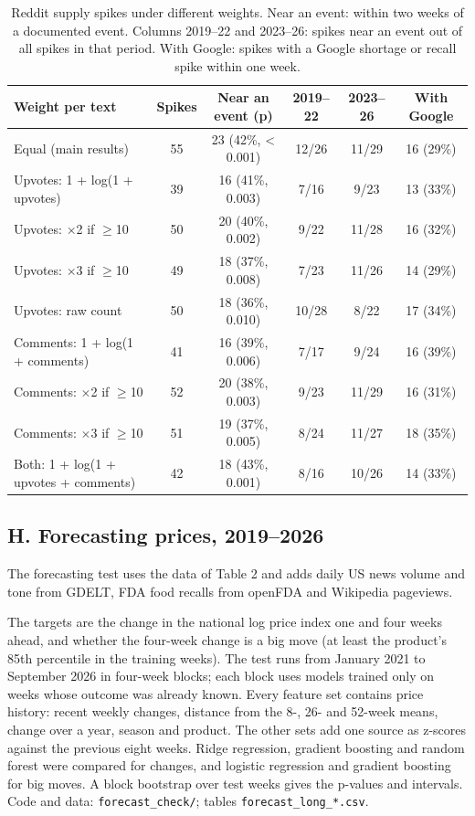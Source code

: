 \documentclass[
  11pt,
]{article}
\begin{document}
\begin{table}[htbp]
\centering\small
\caption{Reddit supply spikes under different weights. Near an event: within two weeks of a documented event. Columns 2019--22 and 2023--26: spikes near an event out of all spikes in that period. With Google: spikes with a Google shortage or recall spike within one week.}
\begin{tabular}{lccccc}
\toprule
Weight per text & Spikes & Near an event (p) & 2019--22 & 2023--26 & With Google \\
\midrule
Equal (main results) & 55 & 23 (42\%, \textless{} 0.001) & 12/26 & 11/29 & 16 (29\%) \\
\addlinespace
Upvotes: 1 + log(1 + upvotes) & 39 & 16 (41\%, 0.003) & 7/16 & 9/23 & 13 (33\%) \\
Upvotes: $\times$2 if $\geq$10 & 50 & 20 (40\%, 0.002) & 9/22 & 11/28 & 16 (32\%) \\
Upvotes: $\times$3 if $\geq$10 & 49 & 18 (37\%, 0.008) & 7/23 & 11/26 & 14 (29\%) \\
Upvotes: raw count & 50 & 18 (36\%, 0.010) & 10/28 & 8/22 & 17 (34\%) \\
\addlinespace
Comments: 1 + log(1 + comments) & 41 & 16 (39\%, 0.006) & 7/17 & 9/24 & 16 (39\%) \\
Comments: $\times$2 if $\geq$10 & 52 & 20 (38\%, 0.003) & 9/23 & 11/29 & 16 (31\%) \\
Comments: $\times$3 if $\geq$10 & 51 & 19 (37\%, 0.005) & 8/24 & 11/27 & 18 (35\%) \\
\addlinespace
Both: 1 + log(1 + upvotes + comments) & 42 & 18 (43\%, 0.001) & 8/16 & 10/26 & 14 (33\%) \\
\bottomrule
\end{tabular}
\end{table}

\subsection{H. Forecasting prices, 2019--2026}\label{h.-forecasting}

The forecasting test uses the data of Table 2 and adds daily US news
volume and tone from GDELT, FDA food recalls from openFDA and Wikipedia
pageviews.

The targets are the change in the national log price index one and four
weeks ahead, and whether the four-week change is a big move (at least
the product's 85th percentile in the training weeks). The test runs
from January 2021 to September 2026 in four-week blocks; each block uses
models trained only on weeks whose outcome was already known. Every
feature set contains price history: recent weekly changes, distance from
the 8-, 26- and 52-week means, change over a year, season and product.
The other sets add one source as z-scores against the previous eight
weeks. Ridge regression, gradient boosting and random forest were
compared for changes, and logistic regression and gradient boosting for
big moves. A block bootstrap over test weeks gives the p-values and
intervals. Code and data: \texttt{forecast\_check/}; tables
\texttt{forecast\_long\_*.csv}.
\end{document}
